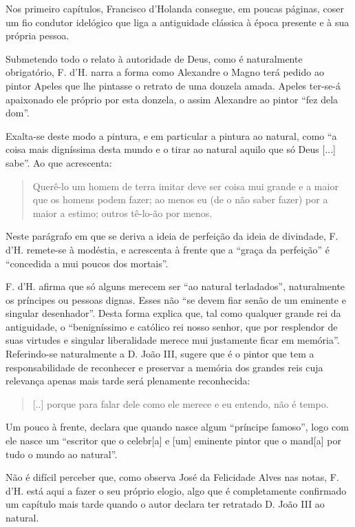 \documentclass{article}
\begin{document}
Nos primeiro capítulos, Francisco d'Holanda consegue, em poucas
páginas, coser um fio condutor idelógico que liga a antiguidade
clássica à época presente e à sua própria pessoa.

Submetendo todo o relato à autoridade de Deus, como é naturalmente
obrigatório, F. d'H. narra a forma como Alexandre o Magno terá pedido
ao pintor Apeles que lhe pintasse o retrato de uma donzela
amada. Apeles ter-se-á apaixonado ele próprio por esta donzela, o
assim Alexandre ao pintor ``fez dela dom''\cite[p.13]{holanda}.

Exalta-se deste modo a pintura, e em particular a pintura ao natural,
como ``a coisa mais digníssima desta mundo e o tirar ao natural aquilo
que só Deus [...] sabe''. Ao que acrescenta:\cite[p.13]{holanda}

\begin{quote}
   Querê-lo um homem de terra imitar deve ser coisa mui grande e a
   maior que os homens podem fazer; ao menos eu (de o não saber fazer)
   por a maior a estimo; outros tê-lo-ão por menos.
\end{quote}

Neste parágrafo em que se deriva a ideia de perfeição da ideia de
divindade, F. d'H. remete-se à modéstia, e acrescenta à frente que a
``graça da perfeição'' é ``concedida a mui poucos dos
mortais''\cite[p.14]{holanda}.

F. d'H. afirma que só alguns merecem ser ``ao natural terladados'',
naturalmente os príncipes ou pessoas dignas. Esses não ``se devem fiar
senão de um eminente e singular desenhador''. Desta forma explica que,
tal como qualquer grande rei da antiguidade, o ``benigníssimo e
católico rei nosso senhor, que por resplendor de suas virtudes e
singular liberalidade merece mui justamente ficar em
memória''\cite[p.15]{holanda}. Referindo-se naturalmente a D. João
III, sugere que é o pintor que tem a responsabilidade de reconhecer e
preservar a memória dos grandes reis cuja relevança apenas mais tarde
será plenamente reconhecida\cite[p.15]{holanda}:

\begin{quote}
  [..] porque para falar dele como ele merece e eu entendo, não é tempo.
\end{quote}

Um pouco à frente, declara que quando nasce algum ``príncipe famoso'', logo com
ele nasce um ``escritor que o celebr[a] e [um] eminente pintor que o
mand[a] por tudo o mundo ao natural''.

Não é difícil perceber que, como observa José da Felicidade Alves nas
notas\cite[p.47]{holanda}, F. d'H. está aqui a fazer o seu próprio
elogio, algo que é completamente confirmado um capítulo mais tarde
quando o autor declara ter retratado D. João III ao natural.
\end{document}
